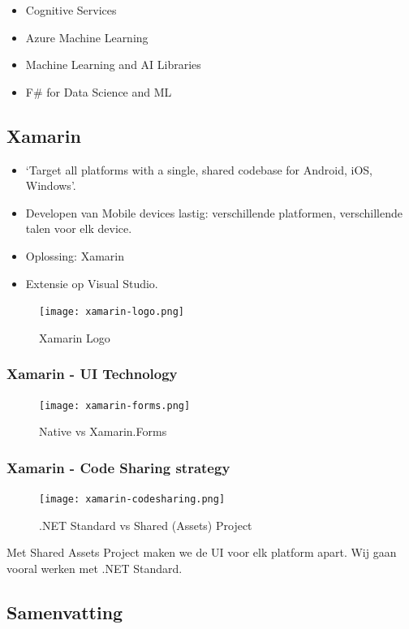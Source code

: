 \documentclass{article}
\begin{document}
\begin{itemize}
    \item Cognitive Services
    \item Azure Machine Learning
    \item Machine Learning and AI Libraries
    \item F\# for Data Science and ML
\end{itemize}

\subsection{Xamarin}
\begin{itemize}
    \item `Target all platforms with a single, shared codebase for Android, iOS, Windows'. 
    \item Developen van Mobile devices lastig: verschillende platformen, verschillende talen voor elk device.
    \item Oplossing: Xamarin
    \item Extensie op Visual Studio.
\end{itemize}


\begin{figure}[H]
    \centering
    \texttt{[image: xamarin-logo.png]}
    \caption{Xamarin Logo}
\end{figure}

\subsubsection{Xamarin - UI Technology}
\begin{figure}[H]
    \centering
    \texttt{[image: xamarin-forms.png]}
    \caption{Native vs Xamarin.Forms}
\end{figure}

\subsubsection{Xamarin - Code Sharing strategy}

\begin{figure}[H]
    \centering
    \texttt{[image: xamarin-codesharing.png]}
    \caption{.NET Standard vs Shared (Assets) Project}
\end{figure}

Met Shared Assets Project maken we de UI voor elk platform apart. Wij gaan vooral werken met .NET Standard.


\subsection{Samenvatting}
\end{document}
